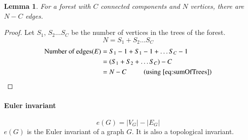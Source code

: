 \documentclass{article}
\newtheorem{lemma}{Lemma}
\begin{document}
\begin{lemma}
    For a forest with $C$ connected components and $N$ vertices, there are $N-C$ edges.
\end{lemma}
\begin{proof}
    Let $S_{1}$, $S_{2}\dots S_{C}$ be the number of vertices in the trees of the forest.\\
    \begin{equation}
        \label{eq:sumOfTrees}
        N=S_{1}+S_{2}\dots S_{C}
    \end{equation}
    \begin{align*}
        \text{Number of edges} (E) &= S_{1}-1+S_{1}-1+\dots S_{C}-1\\
        &= (S_{1}+S_{2}+\dots S_{C})-C\\
        &= N-C \phantom{xxxxx}\text{(using \ref{eq:sumOfTrees})}
    \end{align*}
\end{proof}

\paragraph{Euler invariant}

\begin{equation*}
    e(G) = |V_{G}| - |E_{G}|
\end{equation*}
$e(G)$ is the Euler invariant of a graph $G$. It is also a topological invariant.
\end{document}
